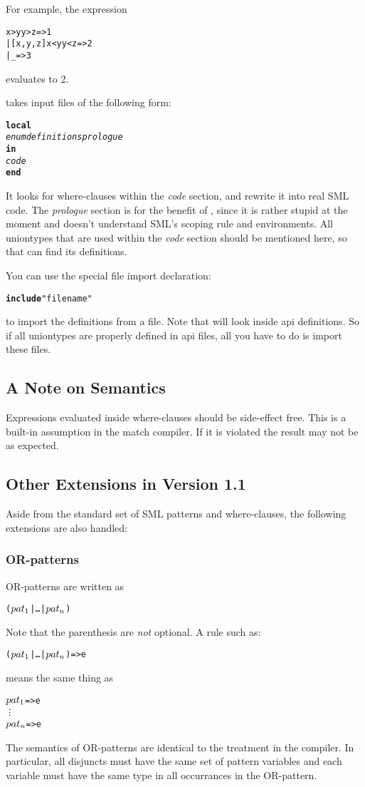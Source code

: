 For example, the expression
\begin{alltt}
   \CASE [1,2,3] \OF 
      [x,y,z] \WHERE x>y \AND y>z => 1
    | [x,y,z] \WHERE x<y \AND y<z => 2
    | _ => 3
\end{alltt}
evaluates to 2.

\Nowhere{} takes input files of the following form:
\begin{alltt}
{\bf local}
    {\sl enum definitions prologue}
{\bf in}
    {\sl code}
{\bf end}
\end{alltt}
It looks for where-clauses within the {\sl code} section, and rewrite it into
real SML code.  The {\sl prologue} section is for the benefit
of \nowhere, since it is rather stupid at the moment and doesn't understand
SML's scoping rule and environments.  
All uniontypes that are used within the {\sl code}
section should be mentioned here, so that \nowhere{} can find its definitions.

You can use the special file import declaration:
\begin{alltt}
  {\bf include} "filename"
\end{alltt}
to import the definitions from a file.  Note that \nowhere{} will look 
inside api definitions.  So if all uniontypes are
properly defined in api files, all you have to do is import these
files.

\subsection{A Note on Semantics}
   Expressions evaluated inside where-clauses should be side-effect free.
This is a built-in assumption in the match compiler.  If it is violated
the result may not be as expected. 

\subsection{Other Extensions in Version 1.1}

  Aside from the standard set of SML patterns and where-clauses, 
the following extensions are also handled:
\subsubsection{OR-patterns}   OR-patterns are written as
\begin{alltt}
   (\(pat\sb{1}\) | \ldots | \(pat\sb{n}\))
\end{alltt}
Note that the parenthesis are {\em not} optional.  A rule such as:
\begin{alltt}
   (\(pat\sb{1}\) | \ldots | \(pat\sb{n}\)) => e
\end{alltt}
means the same thing as
\begin{alltt}
   \(pat\sb{1}\) => e
     \vdots
   \(pat\sb{n}\) => e
\end{alltt}
The semantics of OR-patterns are identical to the treatment in the compiler.
In particular, all disjuncts must have the same set of pattern variables
and each variable must have the same type in all occurrances in the OR-pattern. 

